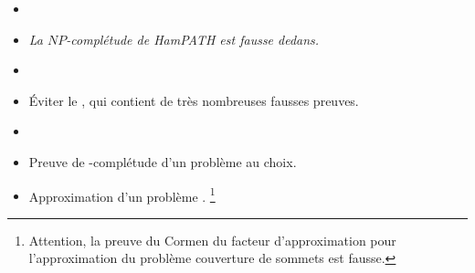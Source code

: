 \documentclass{agregfiche}
\begin{document}
\begin{itemize}
    \item 
\item 
\textit{La $NP$-complétude de HamPATH est fausse dedans.}
\item 
\item Éviter le , qui contient de très nombreuses 
fausses preuves.
\end{itemize}

\secdev

\begin{itemize}
    \item 
\item Preuve de \NP-complétude d'un problème au choix.
\item Approximation d'un problème \NP. \footnote{Attention, la preuve 
du Cormen du facteur d'approximation pour 
l'approximation du problème couverture de sommets est fausse.}
\end{itemize}
\end{document}
